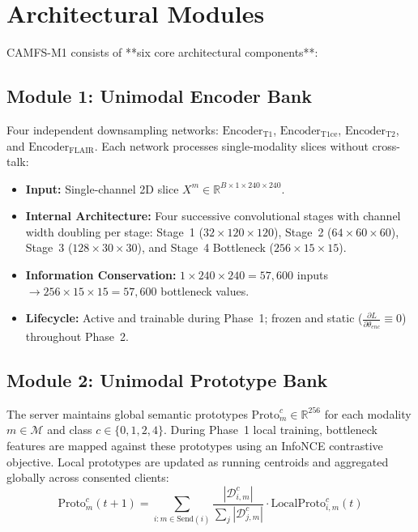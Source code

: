 \documentclass[10pt,a4paper]{article}
\begin{document}
\section{Architectural Modules}

CAMFS-M1 consists of **six core architectural components**:

\subsection{Module 1: Unimodal Encoder Bank}
Four independent downsampling networks: $\text{Encoder}_{\text{T1}}$, $\text{Encoder}_{\text{T1ce}}$, $\text{Encoder}_{\text{T2}}$, and $\text{Encoder}_{\text{FLAIR}}$. Each network processes single-modality slices without cross-talk:
\begin{itemize}[itemsep=1pt, topsep=1pt]
    \item \textbf{Input:} Single-channel 2D slice $X^m \in \mathbb{R}^{B \times 1 \times 240 \times 240}$.
    \item \textbf{Internal Architecture:} Four successive convolutional stages with channel width doubling per stage: Stage~1 ($32 \times 120 \times 120$), Stage~2 ($64 \times 60 \times 60$), Stage~3 ($128 \times 30 \times 30$), and Stage~4 Bottleneck ($256 \times 15 \times 15$).
    \item \textbf{Information Conservation:} $1 \times 240 \times 240 = 57{,}600$ inputs $\to 256 \times 15 \times 15 = 57{,}600$ bottleneck values.
    \item \textbf{Lifecycle:} Active and trainable during Phase~1; frozen and static ($\frac{\partial L}{\partial \theta_{enc}} \equiv 0$) throughout Phase~2.
\end{itemize}

\subsection{Module 2: Unimodal Prototype Bank}
The server maintains global semantic prototypes $\text{Proto}_m^c \in \mathbb{R}^{256}$ for each modality $m \in \mathcal{M}$ and class $c \in \{0, 1, 2, 4\}$.
During Phase~1 local training, bottleneck features are mapped against these prototypes using an InfoNCE contrastive objective. Local prototypes are updated as running centroids and aggregated globally across consented clients:
\begin{equation}
    \text{Proto}_m^c(t+1) = \sum_{i : m \in \text{Send}(i)} \frac{|\mathcal{D}_{i,m}^c|}{\sum_j |\mathcal{D}_{j,m}^c|} \cdot \text{LocalProto}_{i,m}^c(t)
\end{equation}
\end{document}
